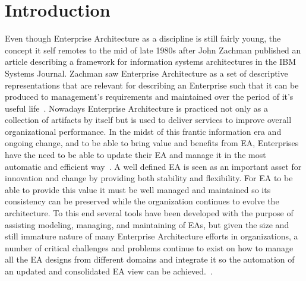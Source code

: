 \documentclass[runningheads]{llncs}
\begin{document}
\section{Introduction}
Even though Enterprise Architecture as a discipline is still fairly young, the concept it self remotes to the mid of late 1980s after John Zachman published an article describing a framework for information systems architectures in the IBM Systems Journal. Zachman saw Enterprise Architecture as a set of descriptive representations that are relevant for describing an Enterprise such that it can be produced to management's requirements and maintained over the period of it's useful life~\cite{ref_1}. Nowadays Enterprise Architecture is practiced not only as a collection of artifacts by itself but is used to deliver services to improve overall organizational performance. In the midst of this frantic information era and ongoing change, and to be able to bring value and benefits from EA, Enterprises have the need to be able to update their EA  and manage it in the most automatic and efficient way~\cite{ref_2}. 
A well defined EA is seen as an important asset for innovation and change by providing both stability and flexibility. For EA to be able to provide this value it must be well managed and maintained so its consistency can be preserved while the organization continues to evolve the architecture. To this end several tools have been developed with the purpose of assisting modeling, managing, and maintaining of EAs, but given the size and still immature nature of many Enterprise Architecture efforts in organizations, a number of critical challenges and problems continue to exist on how to manage all the EA designs from different domains and integrate it so the automation of an updated and consolidated EA view can be achieved.~\cite{ref_3}. 
\end{document}
